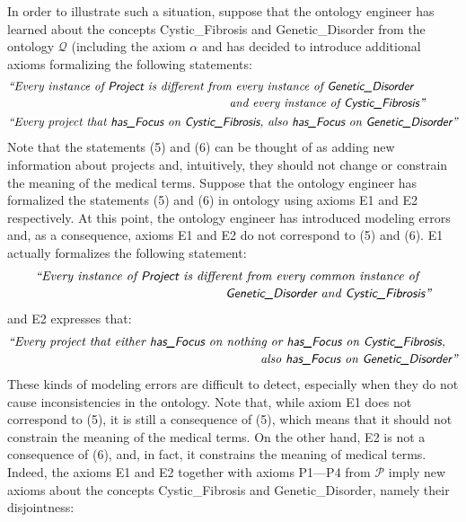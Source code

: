 \documentclass[12pt,a4paper]{article}
\newenvironment{problems}[2][{\color{purple}Question}]{\begin{trivlist}
\item[\hskip \labelsep {\bfseries #1}\hskip \labelsep {\bfseries #2.}]}{\end{trivlist}}
\begin{document}
\begin{problems}{{\color{purple}6 (with 1 bonus mark)}}
In order to illustrate such a situation, suppose that the ontology engineer has learned about the concepts \textsf{Cystic\_Fibrosis} and \textsf{Genetic\_Disorder} from the ontology $\mathcal{Q}$ (including the axiom $\alpha$ and has decided to introduce additional axioms formalizing the following statements:
\begin{align}
&\begin{multlined}[t][10cm]
       \emph{``Every instance of \textsf{Project} is different from every instance of \textsf{Genetic\_Disorder}} \\
        \emph{and every instance of \textsf{Cystic\_Fibrosis}''}
      \end{multlined}\\
&\emph{``Every project that \textsf{has\_Focus} on \textsf{Cystic\_Fibrosis}, also \textsf{has\_Focus} on \textsf{Genetic\_Disorder}''}
\end{align}
Note that the statements (5) and (6) can be thought of as adding new information about projects and, intuitively, they should not change or constrain the meaning of the medical terms. Suppose that the ontology engineer has formalized the statements (5) and (6) in ontology using axioms \textsf{E1} and \textsf{E2} respectively. At this point, the ontology engineer has introduced modeling errors and, as a consequence, axioms \textsf{E1} and \textsf{E2} do not correspond to (5) and (6). \textsf{E1} actually formalizes the following statement: 
\begin{align}
\begin{multlined}[t][10cm]
        \emph{``Every instance of \textsf{Project} is different from every common instance of} \\
        \emph{\textsf{Genetic\_Disorder} and \textsf{Cystic\_Fibrosis}''}
      \end{multlined}
\end{align}and \textsf{E2} expresses that:
\begin{align}
\begin{multlined}[t][10cm]
        \emph{``Every project that either \textsf{has\_Focus} on nothing or \textsf{has\_Focus} on \textsf{Cystic\_Fibrosis},} \\
        \emph{also \textsf{has\_Focus} on \textsf{Genetic\_Disorder}''}
      \end{multlined}
\end{align}These kinds of modeling errors are difficult to detect, especially when they do not cause inconsistencies in the ontology. Note that, while axiom \textsf{E1} does not correspond to (5), it is still a consequence of (5), which means that it should not constrain the meaning of the medical terms. On the other hand, \textsf{E2} is not a consequence of (6), and, in fact, it constrains the meaning of medical terms. Indeed, the axioms \textsf{E1} and \textsf{E2} together with axioms \textsf{P1---P4} from $\mathcal{P}$ imply new axioms about the concepts \textsf{Cystic\_Fibrosis} and \textsf{Genetic\_Disorder}, namely their disjointness:

\end{problems}
\end{document}
